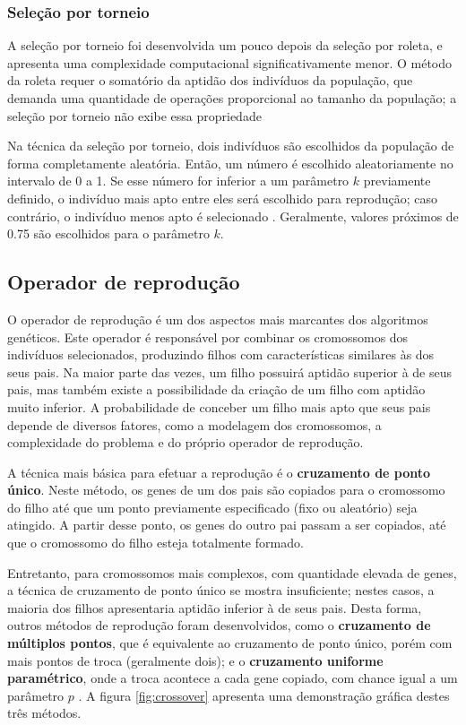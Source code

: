 \documentclass[12pt]{article}
\begin{document}
\subsubsection{Seleção por torneio} \label{sec:tournament}

A seleção por torneio foi desenvolvida um pouco depois da seleção por roleta, e apresenta uma complexidade computacional significativamente menor. O método da roleta requer o somatório da aptidão dos indivíduos da população, que demanda uma quantidade de operações proporcional ao tamanho da população; a seleção por torneio não exibe essa propriedade

Na técnica da seleção por torneio, dois indivíduos são escolhidos da população de forma completamente aleatória. Então, um número é escolhido aleatoriamente no intervalo de 0 a 1. Se esse número for inferior a um parâmetro $k$ previamente definido, o indivíduo mais apto entre eles será escolhido para reprodução; caso contrário, o indivíduo menos apto é selecionado \cite{Mitchell1998}. Geralmente, valores próximos de 0.75 são escolhidos para o parâmetro $k$.

\subsection{Operador de reprodução} \label{sec:crossover}

O operador de reprodução é um dos aspectos mais marcantes dos algoritmos genéticos. Este operador é responsável por combinar os cromossomos dos indivíduos selecionados, produzindo filhos com características similares às dos seus pais. Na maior parte das vezes, um filho possuirá aptidão superior à de seus pais, mas também existe a possibilidade da criação de um filho com aptidão muito inferior. A probabilidade de conceber um filho mais apto que seus pais depende de diversos fatores, como a modelagem dos cromossomos, a complexidade do problema e do próprio operador de reprodução.

A técnica mais básica para efetuar a reprodução é o \textbf{cruzamento de ponto único}. Neste método, os genes de um dos pais são copiados para o cromossomo do filho até que um ponto previamente especificado (fixo ou aleatório) seja atingido. A partir desse ponto, os genes do outro pai passam a ser copiados, até que o cromossomo do filho esteja totalmente formado.

Entretanto, para cromossomos mais complexos, com quantidade elevada de genes, a técnica de cruzamento de ponto único se mostra insuficiente; nestes casos, a maioria dos filhos apresentaria aptidão inferior à de seus pais. Desta forma, outros métodos de reprodução foram desenvolvidos, como o \textbf{cruzamento de múltiplos pontos}, que é equivalente ao cruzamento de ponto único, porém com mais pontos de troca (geralmente dois); e o \textbf{cruzamento uniforme paramétrico}, onde a troca acontece a cada gene copiado, com chance igual a um parâmetro $p$ \cite{Mitchell1998}. A figura \ref{fig:crossover} apresenta uma demonstração gráfica destes três métodos.
\end{document}
